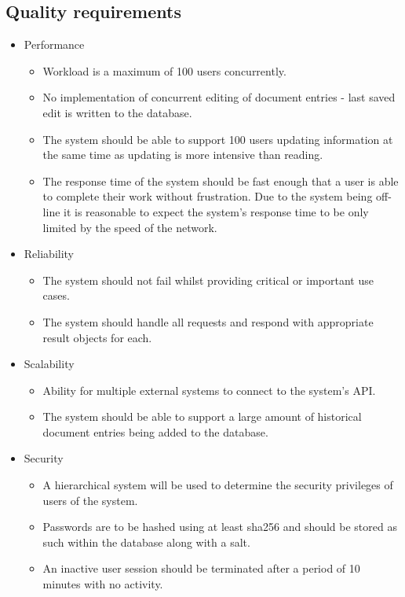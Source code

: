 \documentclass{article}
\begin{document}
	\subsection{Quality requirements}\label{subsec:quality}
		\begin{itemize}
			\item Performance
			\begin{itemize}
				\item Workload is a maximum of 100 users concurrently.
				\item No implementation of concurrent editing of document entries - last saved edit is written to the database.
				\item The system should be able to support 100 users updating information at the same time as updating is more intensive than reading.
				\item The response time of the system should be fast enough that a user is able to complete their work without frustration. Due to the system being off-line it is reasonable to expect the system's response time to be only limited by the speed of the network.
			\end{itemize}
			\item Reliability
			\begin{itemize}
				\item The system should not fail whilst providing critical or important use cases.
				\item The system should handle all requests and respond with appropriate result objects for each.
			\end{itemize}
			\item Scalability
			\begin{itemize}
				\item Ability for multiple external systems to connect to the system's API.
				\item The system should be able to support a large amount of historical document entries being added to the database.
			\end{itemize}
			\item Security
			\begin{itemize}
				\item A hierarchical system will be used to determine the security privileges of users of the system.
				\item Passwords are to be hashed using at least sha256 and should be stored as such within the database along with a salt.
				\item An inactive user session should be terminated after a period of 10 minutes with no activity.

\end{itemize}
\end{itemize}
\end{document}
